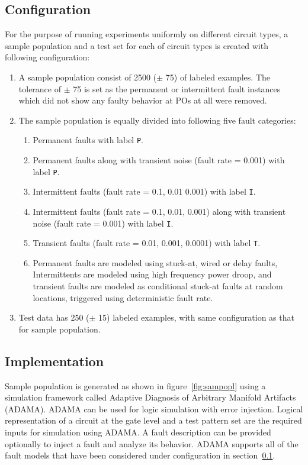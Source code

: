 \subsection{Configuration}
\label{sec:gsp:configuration}
For the purpose of running experiments uniformly on different circuit types, a sample population and a test set for each of circuit types is created with following configuration:
\begin{enumerate}
  \item A sample population consist of 2500 ($\pm$ 75) of labeled examples. The tolerance of $\pm$ 75 is set as the permanent or intermittent fault instances which did not show any faulty behavior at POs at all were removed.
  \item The sample population is equally divided into following five fault categories:
		\begin{enumerate}
    		\item Permanent faults with label \texttt{P}.
    		\item Permanent faults along with transient noise (fault rate = 0.001) with label \texttt{P}.
			\item Intermittent faults (fault rate = 0.1, 0.01 0.001) with label \texttt{I}.
    		\item Intermittent faults (fault rate = 0.1, 0.01, 0.001) along with transient noise (fault rate = 0.001) with label \texttt{I}.
			\item Transient faults (fault rate = 0.01, 0.001, 0.0001) with label \texttt{T}.
		\item Permanent faults are modeled using stuck-at, wired or delay faults, Intermittents are modeled using high frequency power droop, and transient faults are modeled as conditional stuck-at faults at random locations, triggered using deterministic fault rate.
 		 \end{enumerate}
  \item Test data has 250 ($\pm$ 15) labeled examples, with same configuration as that for sample population.
\end{enumerate}

\subsection{Implementation}

Sample population is generated as shown in figure~\ref{fig:sampopl} using a simulation framework called Adaptive Diagnosis of Arbitrary Manifold Artifacts (ADAMA). ADAMA can be used for logic simulation with error injection. Logical representation of a circuit at the gate level and a test pattern set are the required inputs for simulation using ADAMA. A fault description can be provided optionally to inject a fault and analyze its behavior. ADAMA supports all of the fault models that have been considered under configuration in section~\ref{sec:gsp:configuration}.

